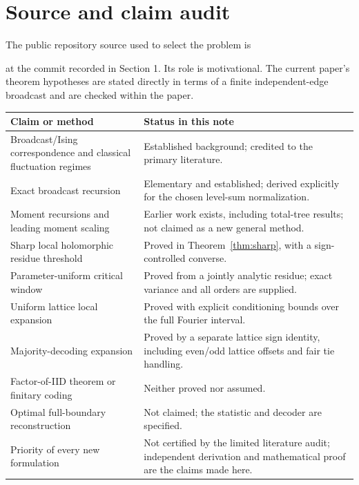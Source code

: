 \documentclass[11pt]{article}
\theoremstyle{definition}
\begin{document}
\appendix
\section{Source and claim audit}

The public repository source used to select the problem is
\begin{quote}\small
{}
\end{quote}
at the commit recorded in Section 1. Its role is motivational. The
current paper's theorem hypotheses are stated directly in terms of a
finite independent-edge broadcast and are checked within the paper.

\begin{longtable}{@{}>{\raggedright\arraybackslash}p{}>{\raggedright\arraybackslash}p{}@{}}
\toprule
Claim or method&Status in this note\\
\midrule
\endhead
Broadcast/Ising correspondence and classical fluctuation regimes&
Established background; credited to the primary literature.\\[4pt]
Exact broadcast recursion&
Elementary and established; derived explicitly for the chosen level-sum
normalization.\\[4pt]
Moment recursions and leading moment scaling&
Earlier work exists, including total-tree results; not claimed as a new
general method.\\[4pt]
Sharp local holomorphic residue threshold&
Proved in Theorem~\ref{thm:sharp}, with a sign-controlled converse.\\[4pt]
Parameter-uniform critical window&
Proved from a jointly analytic residue; exact variance and all orders
are supplied.\\[4pt]
Uniform lattice local expansion&
Proved with explicit conditioning bounds over the full Fourier interval.\\[4pt]
Majority-decoding expansion&
Proved by a separate lattice sign identity, including even/odd lattice
offsets and fair tie handling.\\[4pt]
Factor-of-IID theorem or finitary coding&
Neither proved nor assumed.\\[4pt]
Optimal full-boundary reconstruction&
Not claimed; the statistic and decoder are specified.\\[4pt]
Priority of every new formulation&
Not certified by the limited literature audit; independent derivation
and mathematical proof are the claims made here.\\
\bottomrule
\end{longtable}
\end{document}
